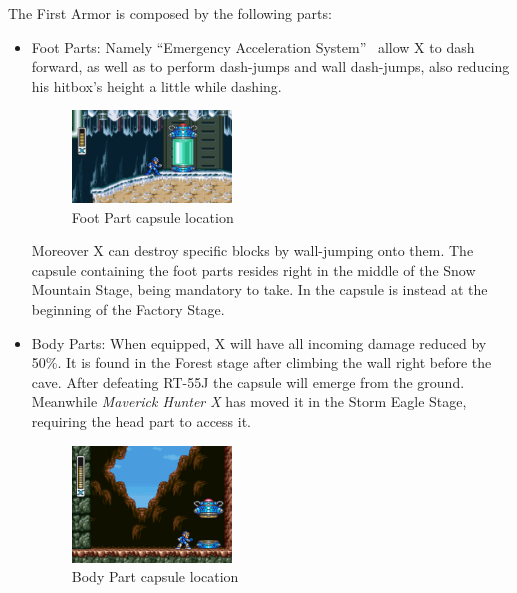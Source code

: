 The First Armor is composed by the following parts:
\begin{itemize}
	\item Foot Parts:	Namely ``Emergency Acceleration System''~\cite{X:Manual} allow X to dash forward, as well as to perform dash-jumps and wall dash-jumps, also reducing his hitbox's height a little while dashing.
	\begin{figure}[htp]
		\centering
		\includegraphics[width=0.4\textwidth]{figures/X1/Chill_penguin/Armor_foot.jpg}
		\caption{Foot Part capsule location}
	\end{figure}
	Moreover X can destroy specific blocks by wall-jumping onto them. The capsule containing the foot parts resides right in the middle of the Snow Mountain Stage, being mandatory to take. In \mhx the capsule is instead at the beginning of the Factory Stage.
	
	
	\item Body Parts: When equipped, X will have all incoming damage reduced by 50\%. It is found in the Forest stage after climbing the wall right before the cave. After defeating RT-55J the capsule will emerge from the ground. Meanwhile \textit{Maverick Hunter X} has moved it in the Storm Eagle Stage, requiring the head part to access it.
	\begin{figure}[htp]
		\centering
		\includegraphics[width=0.4\textwidth]{figures/X1/Sting_chameleon/Sting_armor_capsule.jpg}
		\caption{Body Part capsule location}
	\end{figure}
	

\end{itemize}
